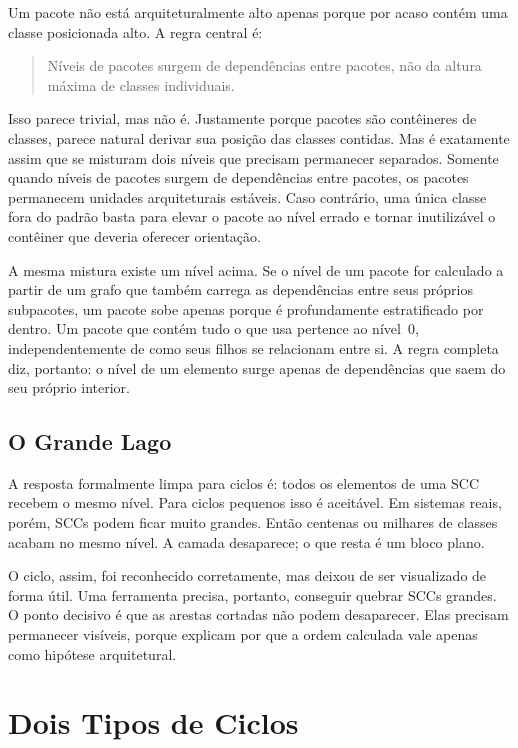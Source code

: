 \documentclass[a4paper,11pt]{article}
\begin{document}
Um pacote n\~ao est\'a arquiteturalmente alto apenas porque por acaso cont\'em
uma classe posicionada alto. A regra central \'e:

\begin{quote}
  N\'iveis de pacotes surgem de depend\^encias entre pacotes, n\~ao da altura
  m\'axima de classes individuais.
\end{quote}

Isso parece trivial, mas n\~ao \'e. Justamente porque pacotes s\~ao
cont\^eineres de classes, parece natural derivar sua posi\c{c}\~ao das classes
contidas. Mas \'e exatamente assim que se misturam dois n\'iveis que precisam
permanecer separados. Somente quando n\'iveis de pacotes surgem de
depend\^encias entre pacotes, os pacotes permanecem unidades arquiteturais
est\'aveis. Caso contr\'ario, uma \'unica classe fora do padr\~ao basta para
elevar o pacote ao n\'ivel errado e tornar inutiliz\'avel o cont\^einer que
deveria oferecer orienta\c{c}\~ao.

A mesma mistura existe um n\'ivel acima. Se o n\'ivel de um pacote for
calculado a partir de um grafo que tamb\'em carrega as depend\^encias entre
seus pr\'oprios subpacotes, um pacote sobe apenas porque \'e profundamente
estratificado por dentro. Um pacote que cont\'em tudo o que usa pertence ao
n\'ivel~0, independentemente de como seus filhos se relacionam entre si. A
regra completa diz, portanto: o n\'ivel de um elemento surge apenas de
depend\^encias que saem do seu pr\'oprio interior.

\subsection{O Grande Lago}

A resposta formalmente limpa para ciclos \'e: todos os elementos de uma SCC
recebem o mesmo n\'ivel. Para ciclos pequenos isso \'e aceit\'avel. Em sistemas
reais, por\'em, SCCs podem ficar muito grandes. Ent\~ao centenas ou milhares
de classes acabam no mesmo n\'ivel. A camada desaparece; o que resta \'e um
bloco plano.

O ciclo, assim, foi reconhecido corretamente, mas deixou de ser visualizado de
forma \'util. Uma ferramenta precisa, portanto, conseguir quebrar SCCs grandes.
O ponto decisivo \'e que as arestas cortadas n\~ao podem desaparecer. Elas
precisam permanecer vis\'iveis, porque explicam por que a ordem calculada vale
apenas como hip\'otese arquitetural.

\section{Dois Tipos de Ciclos}
\end{document}
